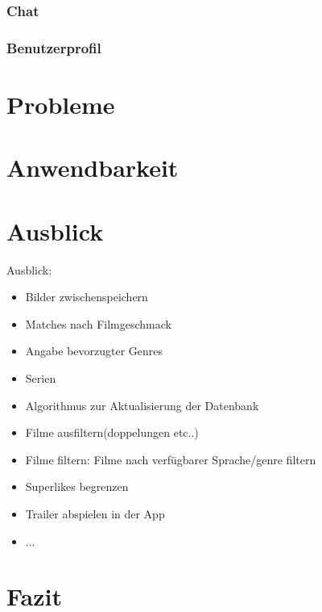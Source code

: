 \documentclass[11pt,a4paper]{article}
\begin{document}
\subsubsection{Chat}
\label{sec:UI-Chat}

\subsubsection{Benutzerprofil}
\label{sec:benutzerprofil}




\clearpage
\section{Probleme}
\label{sec:probleme}



\clearpage
\section{Anwendbarkeit}
\label{sec:anwendbarkeit}



\clearpage
\section{Ausblick}
Ausblick:
\begin{itemize}
\item Bilder zwischenspeichern
\item Matches nach Filmgeschmack
\item Angabe bevorzugter Genres
\item Serien
\item Algorithmus zur Aktualisierung der Datenbank
\item Filme ausfiltern(doppelungen etc..)
\item Filme filtern: Filme nach verfügbarer Sprache/genre filtern
\item Superlikes begrenzen
\item Trailer abspielen in der App
\item ...
\end{itemize}
\label{sec:ausblick}



\clearpage
\section{Fazit}
\label{sec:fazit}



\clearpage
\appendix
\end{document}
